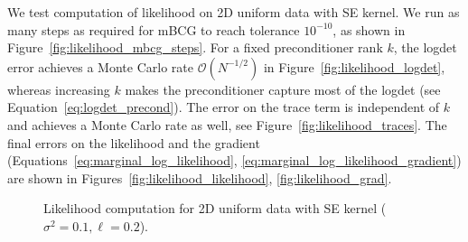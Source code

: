 \documentclass{article}
\begin{document}
We test computation of likelihood on 2D uniform data with SE kernel. We run as many steps as required for mBCG to reach tolerance $10^{-10}$, as shown in Figure~\ref{fig:likelihood_mbcg_steps}. For a fixed preconditioner rank $k$, the logdet error achieves a Monte Carlo rate $\mathcal O(N^{-1/2})$ in Figure~\ref{fig:likelihood_logdet}, whereas increasing $k$ makes the preconditioner capture most of the logdet (see Equation~\ref{eq:logdet_precond}). The error on the trace term is independent of $k$ and achieves a Monte Carlo rate as well, see Figure~\ref{fig:likelihood_traces}. The final errors on the likelihood and the gradient (Equations~\ref{eq:marginal_log_likelihood}, \ref{eq:marginal_log_likelihood_gradient}) are shown in Figures~\ref{fig:likelihood_likelihood}, \ref{fig:likelihood_grad}.


\begin{figure}
    \centering
    \label{fig:likelihood}
    \caption{Likelihood computation for 2D uniform data with SE kernel ($\sigma^2 = 0.1, \ell = 0.2$).}
\end{figure}
\end{document}
